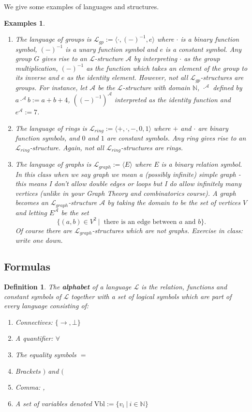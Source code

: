 \documentclass[11pt]{article}
\newtheorem{examples}[theorem]{Examples}
\newtheorem{definition}[theorem]{Definition}
\newcommand{\mcal}[1]{\mathcal{#1}}
\newcommand{\N}{\mathbb{N}}
\newcommand{\st}{\ \vert \ }
\begin{document}
We give some examples of languages and structures.

\begin{examples}
\begin{enumerate}
\item The language of groups is $\mcal{L}_{gp}:=\langle \cdot, (-)^{-1}, e\rangle$ where $\cdot$ is a binary function symbol, $(-)^{-1}$ is a unary function symbol and $e$ is a constant symbol. Any group $G$ gives rise to an $\mcal{L}$-structure $\mcal{A}$ by interpreting $\cdot$ as the group multiplication, $(-)^{-1}$ as the function which takes an element of the group to its inverse and $e$ as the identity element. However, not all $\mcal{L}_{gp}$-structures are groups. For instance, let $\mcal{A}$ be the $\mcal{L}$-structure with domain $\N$, $\cdot^{\mcal{A}}$ defined by $a\cdot^{\mcal{A}}b:=a+b+4$, $((-)^{-1})^{\mcal{A}}$ interpreted as the identity function and $e^\mcal{A}:=7$.
\item The language of rings is $\mcal{L}_{ring}:=\langle +,\cdot, -, 0,1\rangle$ where $+$ and $\cdot$ are binary function symbols, and $0$ and $1$ are constant symbols. Any ring gives rise to an $\mcal{L}_{ring}$-structure. Again, not all $\mcal{L}_{ring}$-structures are rings.
\item The language of graphs is $\mcal{L}_{graph}:=\langle E\rangle$ where $E$ is a binary relation symbol. In this class when we say graph we mean a (possibly infinite) simple graph - this means I don't allow double edges or loops but I do allow infinitely many vertices (unlike in your Graph Theory and combinatorics course). A graph becomes an $\mcal{L}_{graph}$-structure $\mcal{A}$ by taking the domain to be the set of vertices $V$ and letting $E^{\mcal{A}}$ be the set
\[\{(a,b)\in V^2 \st \text{ there is an edge between $a$ and $b$}\}.\] Of course there are $\mcal{L}_{graph}$-structures which are not graphs. Exercise in class: write one down.
\end{enumerate}
\end{examples}

\subsection{Formulas}

\begin{definition}
The \textbf{alphabet} of a language $\mcal{L}$ is the relation, functions and constant symbols of $\mcal{L}$ together with a set of logical symbols which are part of every language consisting of:
\begin{enumerate}
\item Connectives: $\{\rightarrow, \bot\}$
\item A quantifier: $\forall$
\item The equality symbols $=$
\item Brackets $)$ and $($
\item Comma: ,
\item A set of variables denoted $\textrm{Vbl}:=\{v_i \st i\in \N\}$
\end{enumerate}
\end{definition}
\end{document}
